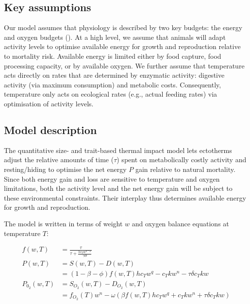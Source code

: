 \documentclass[a4paper, toc=index,abstract=true]{scrartcl}\usepackage[]{graphicx}\usepackage[]{color}
\begin{document}
\begin{spacing}{1.9}
\subsection{Key assumptions}

Our model assumes that physiology is described by two key budgets: the energy and oxygen budgets (\cite{holt_climate_2015,holt_climate_2014}). At a high level, we assume that animals will adapt activity levels to optimise available energy for growth and reproduction relative to mortality risk. Available energy is limited either by food capture, food processing capacity, or by available oxygen. We further assume that temperature acts directly on rates that are determined by enzymatic activity: digestive activity (via maximum consumption) and metabolic costs. Consequently, temperature only acts on ecological rates (e.g., actual feeding rates) via optimisation of activity levels.

\subsection{Model description}

The quantitative size- and trait-based thermal impact model lets ectotherms adjust the relative amounts of time ($\tau$) spent on metabolically costly activity and resting/hiding to optimise the net energy $P$ gain relative to natural mortality. Since both energy gain and loss are sensitive to temperature and oxygen limitations, both the activity level and the net energy gain will be subject to these environmental constraints. Their interplay thus determines available energy for growth and reproduction.

The model is written in terms of weight $w$ and oxygen balance equations at temperature $T$:

\begin{align}
f(w,T) &= \frac{\tau }{\tau  + \frac{h c_T w^{q-p}}{\gamma\Theta} } \label{eq:f} \\
P(w,T) &= S(w,T) - D(w,T) \\
  &=(1-\beta-\phi)f(w,T) h c_T w^q  - c_T k w^n - \tau \delta c_T k w  \\
P_{0_2}(w,T) &= S_{O_2}(w,T) - D_{O_2}(w,T) \\
        &= f_{O_2}(T)w^n - \omega \left( \beta f(w,T) h c_T w^q + c_T k w^n + \tau \delta c_T k w \right)
\end{align}



\end{spacing}
\end{document}
